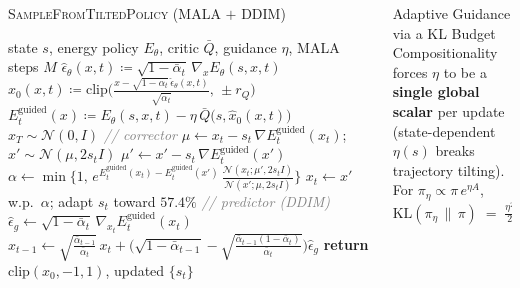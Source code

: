 \documentclass[final,hyperref={pdfpagelabels=false}]{beamer}
\newcommand{\KL}{\mathrm{KL}}
\newcommand{\Var}{\mathrm{Var}}
\newlength{\colwidth}
\begin{document}
\begin{frame}[t]
\begin{columns}[t]
\begin{column}{\colwidth}
\vspace{0.6cm}

\begin{block}{\Large \textsc{SampleFromTiltedPolicy} (MALA $+$ DDIM)}
\small
\begin{algorithmic}[1]
\REQUIRE state $s$, energy policy $E_\theta$, critic $\bar Q$, guidance $\eta$, MALA steps $M$
\STATE $\hat\epsilon_\theta(x,t)\coloneqq\sqrt{1{-}\bar\alpha_t}\,\nabla_x E_\theta(s,x,t)$
\STATE $\hat x_0(x,t)\coloneqq \mathrm{clip}\!\bigl(\tfrac{x-\sqrt{1{-}\bar\alpha_t}\,\hat\epsilon_\theta(x,t)}{\sqrt{\bar\alpha_t}},\,{\pm}r_Q\bigr)$
\STATE $E^{\mathrm{guided}}_t(x)\coloneqq E_\theta(s,x,t)-\eta\,\bar Q\!\bigl(s,\hat x_0(x,t)\bigr)$
\STATE $x_T\sim\mathcal{N}(0,I)$
  \STATE \textcolor{gray}{\textit{// corrector}}
    \STATE $\mu \leftarrow x_t - s_t\,\nabla E^{\mathrm{guided}}_t(x_t)$; \;
           $x'\sim\mathcal{N}(\mu,2s_t I)$
    \STATE $\mu' \leftarrow x' - s_t\,\nabla E^{\mathrm{guided}}_t(x')$
    \STATE $\alpha \leftarrow \min\!\bigl\{1,\,e^{E^{\mathrm{guided}}_t(x_t)-E^{\mathrm{guided}}_t(x')}\,\tfrac{\mathcal{N}(x_t;\mu',2s_t I)}{\mathcal{N}(x';\mu,2s_t I)}\bigr\}$
    \STATE $x_t \leftarrow x'$ w.p.\ $\alpha$;\; adapt $s_t$ toward $57.4\%$
  \ENDFOR
  \STATE \textcolor{gray}{\textit{// predictor (DDIM)}}
  \STATE $\hat\epsilon_g \leftarrow \sqrt{1{-}\bar\alpha_t}\,\nabla_{x_t} E^{\mathrm{guided}}_t(x_t)$
  \STATE $x_{t-1} \leftarrow \sqrt{\tfrac{\bar\alpha_{t-1}}{\bar\alpha_t}}\,x_t + \bigl(\sqrt{1{-}\bar\alpha_{t-1}}-\sqrt{\tfrac{\bar\alpha_{t-1}(1{-}\bar\alpha_t)}{\bar\alpha_t}}\bigr)\hat\epsilon_g$
\ENDFOR
\STATE \textbf{return} $\mathrm{clip}(x_0,{-}1,1)$, updated $\{s_t\}$
\end{algorithmic}
\end{block}

\end{column}

\begin{column}{\colwidth}

\begin{block}{\Large Adaptive Guidance via a KL Budget}
Compositionality forces $\eta$ to be a \textbf{single global scalar} per update
(state-dependent $\eta(s)$ breaks trajectory tilting). For $\pi_\eta\propto \pi\, e^{\eta A}$,
\[
\KL(\pi_\eta\,\|\,\pi) \;=\; \tfrac{\eta^2}{2}\,\Var_\pi(A)\;+\;O(\eta^3).
\]


\end{block}
\end{column}
\end{columns}
\end{frame}
\end{document}
